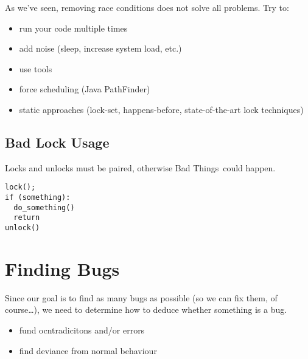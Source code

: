 \documentclass[12pt]{article}
\begin{document}
As we've seen, removing race conditions does not solve all problems. Try to:
\begin{itemize}
\item run your code multiple times
\item add noise (sleep, increase system load, etc.)
\item use tools
\item force scheduling (Java PathFinder)
\item static approaches (lock-set, happens-before, state-of-the-art lock techniques)
\end{itemize}

\subsection{Bad Lock Usage}
Locks and unlocks must be paired, otherwise Bad Things\texttrademark\ could happen.
\begin{verbatim}
lock();
if (something):
  do_something()
  return
unlock()
\end{verbatim}

\section{Finding Bugs}
Since our goal is to find as many bugs as possible (so we can fix them, of course\dots), we need to determine how to deduce whether something is a bug.
\begin{itemize}
\item fund ocntradicitons and/or errors
\item find deviance from normal behaviour
\end{itemize}
\end{document}
